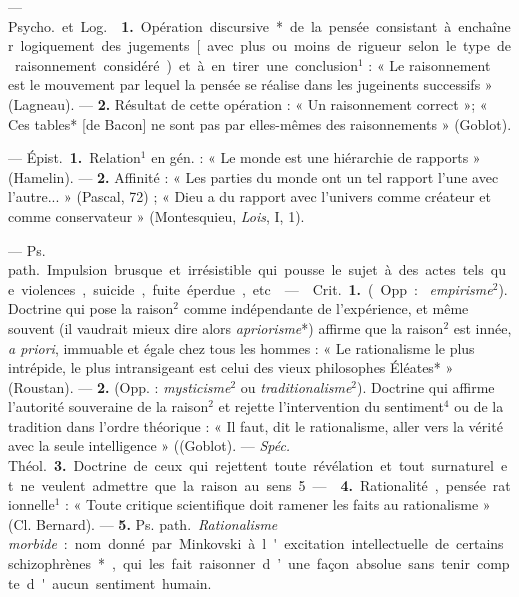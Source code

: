 \begin{itemize}[leftmargin=1cm, label=, itemsep=1pt]
 — \si{Psycho.} et \si{Log.}  {\bf 1.}
Opération discursive* de la pensée consistant à enchaîner logiquement des
jugements [avec plus ou moins de rigueur selon le type de raisonnement
considéré) et à en tirer une conclusion$^1$ : « Le raisonnement est
le mouvement par lequel la pensée se réalise dans les jugeinents successifs
» (Lagneau). —  {\bf 2.} Résultat de cette opération : « Un
raisonnement correct »; « Ces tables* [de Bacon] ne sont pas par elles-mêmes
des raisonnements » (Goblot).

 — \si{Épist.} {\bf 1.} Relation$^1$ en gén. : « Le monde est une
hiérarchie de rapports » (Hamelin). — {\bf 2.} Affinité : « Les parties du
monde ont un tel rapport l’une avec l’autre... » (Pascal, 72) ; « Dieu a du
rapport avec l’univers comme créateur et comme conservateur » (Montesquieu,
{\it Lois}, I, 1).

 — \si{Ps. path.} Impulsion brusque et irrésistible qui pousse le
sujet à des actes tels que violences, suicide, fuite éperdue, etc.

 —  \si{Crit.} {\bf 1.} (Opp. : {\it
empirisme}$^2$). Doctrine qui pose la raison$^2$ comme indépendante de
l'expérience, et même souvent (il vaudrait mieux dire alors
{\it apriorisme}*) affirme que la raison$^2$ est innée, {\it a priori},
immuable et égale chez tous les hommes : « Le rationalisme le plus intrépide,
le plus intransigeant est celui des vieux philosophes Éléates* » (Roustan). —
{\bf 2.} (Opp. : {\it mysticisme}$^2$ ou {\it traditionalisme}$^2$). Doctrine
qui affirme l’autorité souveraine de la raison$^2$ et rejette l'intervention
du sentiment$^4$ ou de la tradition dans l’ordre théorique : « Il faut, dit
le rationalisme, aller vers la vérité avec la seule intelligence » ((Goblot).
— {\it Spéc.} \si{Théol.} {\bf 3.} Doctrine de ceux qui rejettent toute
révélation et tout surnaturel et ne veulent admettre que la raison au sens 5.

—  {\bf 4.} Rationalité, pensée rationnelle$^1$ : « Toute
critique scientifique doit ramener les faits au rationalisme » (Cl. Bernard).
— {\bf 5.} \si{Ps. path.} {\it Rationalisme morbide} : nom donné par
Minkovski à l'excitation intellectuelle de certains schizophrènes*, qui les
fait raisonner d’une façon absolue sans tenir compte d'aucun sentiment humain.


\end{itemize}
